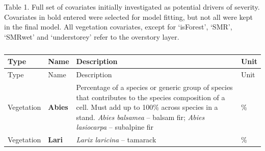 \documentclass[
  numafflabel,
  authoryear,
  preprint]{elsarticle}
\begin{document}
\begin{landscape}

Table 1. Full set of covariates initially investigated as potential
drivers of severity. Covariates in bold entered were selected for model
fitting, but not all were kept in the final model. All vegetation
covariates, except for `isForest', `SMR', `SMRwet' and `understorey'
refer to the overstory layer.

\begin{longtable}[]{@{}
  >{\raggedright\arraybackslash}p{}
  >{\raggedright\arraybackslash}p{}
  >{\raggedright\arraybackslash}p{}
  >{\raggedright\arraybackslash}p{}@{}}
\caption{}\label{tbl-1}\tabularnewline
\toprule\noalign{}
\begin{minipage}[b]{\linewidth}\raggedright
Type
\end{minipage} & \begin{minipage}[b]{\linewidth}\raggedright
Name
\end{minipage} & \begin{minipage}[b]{\linewidth}\raggedright
Description
\end{minipage} & \begin{minipage}[b]{\linewidth}\raggedright
Unit
\end{minipage} \\
\midrule\noalign{}
\endfirsthead
\toprule\noalign{}
\begin{minipage}[b]{\linewidth}\raggedright
Type
\end{minipage} & \begin{minipage}[b]{\linewidth}\raggedright
Name
\end{minipage} & \begin{minipage}[b]{\linewidth}\raggedright
Description
\end{minipage} & \begin{minipage}[b]{\linewidth}\raggedright
Unit
\end{minipage} \\
\midrule\noalign{}
\endhead
\bottomrule\noalign{}
\endlastfoot
Vegetation & \textbf{Abies} & Percentage of a species or generic group
of species that contributes to the species composition of a cell. Must
add up to 100\% across species in a stand. \emph{Abies balsamea} --
balsam fir; \emph{Abies lasiocarpa} -- subalpine fir & \% \\
Vegetation & \textbf{Lari} & \emph{Larix laricina} -- tamarack & \% \\

\end{longtable}
\end{landscape}
\end{document}
